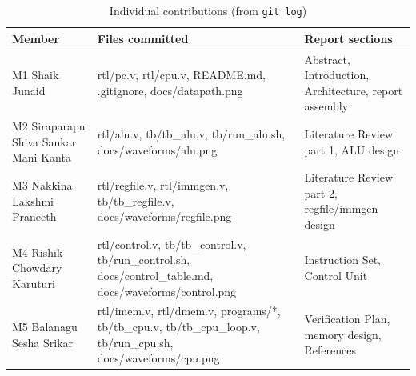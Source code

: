 \documentclass[conference]{IEEEtran}
\begin{document}
\begin{table}[h]
\centering\footnotesize\setlength{\tabcolsep}{3pt}
\caption{Individual contributions (from \texttt{git log})}
\label{tab:contrib}
\begin{tabular}{L{1.9cm}L{4.1cm}L{2.2cm}}
\toprule
Member & Files committed & Report sections \\
\midrule
M1 Shaik Junaid & rtl/pc.v, rtl/cpu.v, README.md, .gitignore, docs/datapath.png & Abstract, Introduction, Architecture, report assembly \\
M2 Siraparapu Shiva Sankar Mani Kanta & rtl/alu.v, tb/tb\_alu.v, tb/run\_alu.sh, docs/waveforms/alu.png & Literature Review part 1, ALU design \\
M3 Nakkina Lakshmi Praneeth & rtl/regfile.v, rtl/immgen.v, tb/tb\_regfile.v, docs/waveforms/regfile.png & Literature Review part 2, regfile/immgen design \\
M4 Rishik Chowdary Karuturi & rtl/control.v, tb/tb\_control.v, tb/run\_control.sh, docs/control\_table.md, docs/waveforms/control.png & Instruction Set, Control Unit \\
M5 Balanagu Sesha Srikar & rtl/imem.v, rtl/dmem.v, programs/*, tb/tb\_cpu.v, tb/tb\_cpu\_loop.v, tb/run\_cpu.sh, docs/waveforms/cpu.png & Verification Plan, memory design, References \\
\bottomrule
\end{tabular}
\end{table}



\end{document}

